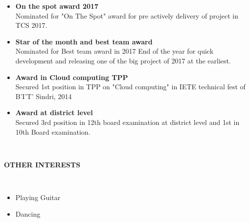 \documentclass[a4paper,10pt]{article}
\newcommand{\lsep}{-0.5cm}
\newcommand{\resheading}[1]{{\small \colorbox{mygrey}{\begin{minipage}{0.975\textwidth}{\textbf{#1 \vphantom{p\^{E}}}}\end{minipage}}}}
\begin{document}
\begin{itemize}
\item \noindent \textbf{On the spot award 2017} \\
Nominated for "On The Spot" award for pre actively delivery of project in TCS 2017.

\item \noindent \textbf{Star of the month and best team award} \\
Nominated for Best team award in 2017 End of the year for quick development and releasing one of the big project of 2017 at the earliest.

\item \noindent \textbf{Award in Cloud computing TPP} \\
Secured 1st position in TPP on "Cloud computing" in IETE technical fest of B'I'T' Sindri, 2014
\item \noindent \textbf{Award at district level} \\
Secured 3rd position in 12th board examination at district level and 1st in 10th Board examination. 
\end{itemize}
\hspace{0.5cm}\\[-0.2cm]
\resheading{\textbf{OTHER INTERESTS} }\\[\lsep]
\begin{itemize}
	\item Playing Guitar
	\item Dancing
\end{itemize}
\end{document}

